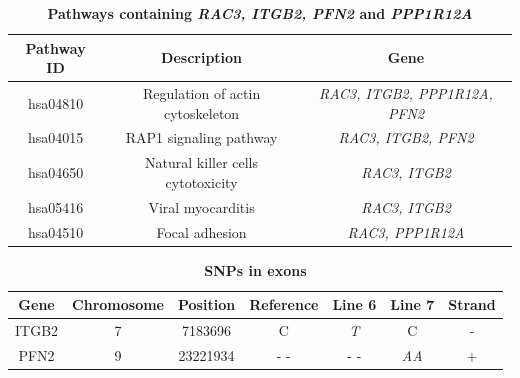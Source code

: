 \documentclass[10pt]{article}
\begin{document}
\begin{table}[!ht]
\caption{
\bf{Pathways containing \textit{RAC3, ITGB2, PFN2} and \textit{PPP1R12A}}}
\begin{tabular}{ccc}
\hline
Pathway ID &  Description & Gene \\
\hline
hsa04810 & Regulation of actin cytoskeleton & \textit{RAC3, ITGB2, PPP1R12A, PFN2} \\
hsa04015 & RAP1 signaling pathway & \textit{RAC3, ITGB2, PFN2} \\
hsa04650 & Natural killer cells cytotoxicity & \textit{RAC3, ITGB2} \\
hsa05416 & Viral myocarditis & \textit{RAC3, ITGB2} \\
hsa04510 & Focal adhesion & \textit{RAC3, PPP1R12A} \\
\hline
\end{tabular}
\begin{flushleft}
\end{flushleft}
\label{tab:integrin}
\end{table}

\begin{table}[!ht]
\caption{
\bf{SNPs in exons}}
\begin{tabular}{ccccccc}
\hline
Gene &  Chromosome & Position & Reference & Line 6 & Line 7 & Strand \\
\hline
ITGB2 & 7 & 7183696 & C & \textit{T} & C & - \\
PFN2 & 9 & 23221934 & -  - & - - & \textit{AA} & + \\
\hline
\end{tabular}
\begin{flushleft}
\end{flushleft}
\label{tab:deu_snps}
\end{table}
\end{document}
